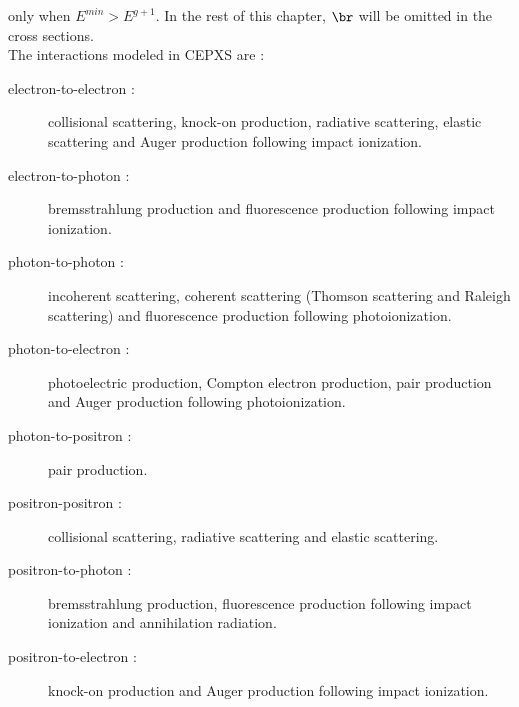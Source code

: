 only when $E^{min} > E^{g+1}$. In the rest of this chapter, $\br$ will be
omitted in the cross sections.\\
The interactions modeled in CEPXS are \cite{cepxs} :
\begin{description}
\item [electron-to-electron :] collisional scattering, knock-on production,
radiative scattering, elastic scattering and Auger production following impact
ionization.
\item [electron-to-photon :] bremsstrahlung production and fluorescence
production following impact ionization.
\item [photon-to-photon :] incoherent scattering, coherent scattering (Thomson 
scattering and Raleigh scattering) and fluorescence production following
photoionization.
\item [photon-to-electron :] photoelectric production, Compton electron
production, pair production and Auger production following photoionization.
\item [photon-to-positron :] pair production.
\item [positron-positron :] collisional scattering, radiative scattering and
elastic scattering.
\item [positron-to-photon :] bremsstrahlung production, fluorescence
production following impact ionization and annihilation radiation.
\item [positron-to-electron :] knock-on production and Auger production
following impact ionization.
\end{description}

